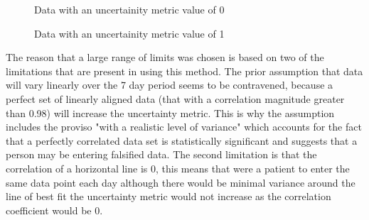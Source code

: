 \documentclass[11pt]{article}
\begin{document}
\begin{figure}[h!] 
\caption{Data with an uncertainity metric value of 0}
\endminipage\hfill
{}
\caption{Data with an uncertainity metric value of 1}
\endminipage
\end{figure} 

The reason that a large range of limits was chosen is based on two of the limitations that are present in using this method. The prior assumption that data will vary linearly over the 7 day period seems to be contravened, because a perfect set of linearly aligned data (that with a correlation magnitude greater than 0.98) will increase the uncertainty metric. This is why the assumption includes the proviso "with a realistic level of variance" which accounts for the fact that a perfectly correlated data set is statistically significant and suggests that a person may be entering falsified data. The second limitation is that the correlation of a horizontal line is 0, this means that were a patient to enter the same data point each day although there would be minimal variance around the line of best fit the uncertainty metric would not increase as the correlation coefficient would be 0. 
\end{document}
